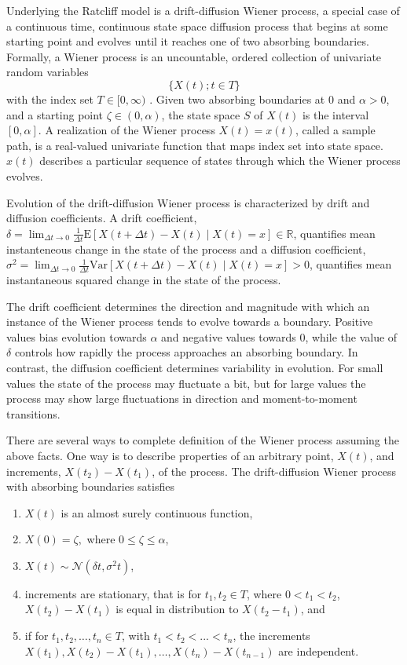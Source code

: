 \documentclass[12pt]{article}
\begin{document}
Underlying the Ratcliff model is a drift-diffusion Wiener process, a special case of a continuous time, continuous state space
diffusion process that begins at some starting point and evolves until
it reaches one of two absorbing boundaries\citep{Ros2014,KarTay1975,KarTay1981}. Formally, a Wiener process is an
uncountable, ordered collection of univariate random variables 
%
\begin{equation} 
\{X(t); t \in T\} 
\end{equation} 
% 
with the index set $T \in [0, \infty)$ \citep{KarTay1981,Smi2000}. Given two absorbing boundaries at $0$ and $\alpha>0$, and a starting point
$\zeta \in (0, \alpha)$, the state space $S$ of $X(t)$ is the
interval $[0, \alpha]$. A realization of the Wiener process $X(t) = x(t)$, called a sample path, is a real-valued univariate function that maps index set into state space. $x(t)$ describes a particular sequence of states through which the Wiener process evolves.

Evolution of the drift-diffusion Wiener process is characterized by drift and diffusion coefficients. A drift coefficient, $\delta = \lim_{\Delta t \to 0}\frac{1}{\Delta t}\mathrm{E}\left[X(t + \Delta t) - X(t) \mid X(t) = x\right] \in \mathbb{R}$, quantifies mean instanteneous change in the state of the process and a diffusion coefficient, $\sigma^2 = \lim_{\Delta t \to 0}\frac{1}{\Delta t}\mathrm{Var}\left[X(t + \Delta t) - X(t) \mid X(t) = x\right] > 0$, quantifies mean instantaneous squared change in the state of the process. 

The drift coefficient determines the direction and magnitude with which an instance of the Wiener process tends to evolve towards a boundary. Positive values bias evolution towards $\alpha$ and negative values towards 0, while the value of $\delta$ controls how rapidly the process approaches an absorbing boundary. In contrast, the diffusion coefficient determines variability in evolution. For small values the state of the process may fluctuate a bit, but for large values the process may show large fluctuations in direction and moment-to-moment transitions.

There are several ways to
complete definition of the Wiener process assuming the above facts. One way is to describe properties
of an arbitrary point, $X(t)$, and increments, $X(t_2) - X(t_1)$, of the process. The drift-diffusion Wiener process with absorbing boundaries 
satisfies
%
\begin{enumerate} 
\item $X(t)$ is an almost surely continuous function,
%
\item $X(0) = \zeta,$ where $0 \le \zeta \le \alpha$,
%
\item $X(t) \sim \mathcal{N}(\delta t, \sigma^2 t)$,
%
\item increments are stationary, that is for $t_1, t_2 \in T$, where $0 < t_1 < t_2$, $X(t_2) - X(t_1)$ is equal in distribution to $X(t_2 - t_1)$, and
%
\item if for $t_1, t_2, \ldots, t_n \in T$, with $t_1 < t_2 < ... < t_n$, the increments $X(t_1),
X(t_2) - X(t_1), \ldots, X(t_n) - X(t_{n-1})$ are independent.
\end{enumerate} 
%
\end{document}
